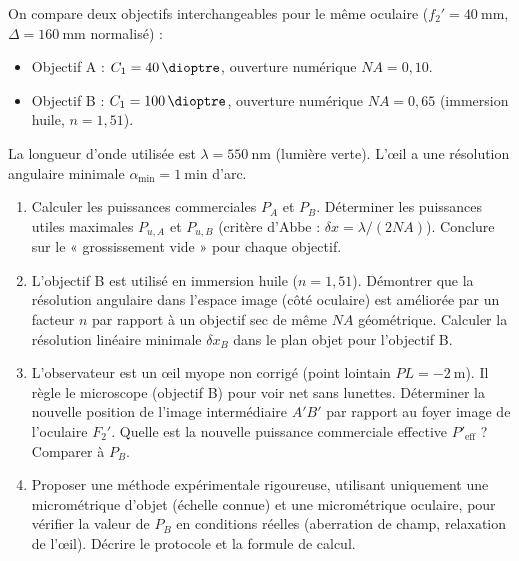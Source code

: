 \documentclass[11pt]{article}
\begin{document}
\begin{exercice}
On compare deux objectifs interchangeables pour le même oculaire ($f_2' = \SI{40}{\milli\metre}$, $\Delta = \SI{160}{\milli\metre}$ normalisé) :
\begin{itemize}
    \item Objectif A : $C_1 = \SI{+40}{\dioptre}$, ouverture numérique $NA = 0,10$.
    \item Objectif B : $C_1 = \SI{+100}{\dioptre}$, ouverture numérique $NA = 0,65$ (immersion huile, $n=1,51$).
\end{itemize}
La longueur d'onde utilisée est $\lambda = \SI{550}{\nano\metre}$ (lumière verte). L'œil a une résolution angulaire minimale $\alpha_{\min} = \SI{1}{\minute}$ d'arc.
\begin{enumerate}
    \item Calculer les puissances commerciales $P_A$ et $P_B$. Déterminer les puissances utiles maximales $P_{u,A}$ et $P_{u,B}$ (critère d'Abbe : $\delta x = \lambda / (2 NA)$). Conclure sur le « grossissement vide » pour chaque objectif.
    \item L'objectif B est utilisé en immersion huile ($n=1,51$). Démontrer que la résolution angulaire dans l'espace image (côté oculaire) est améliorée par un facteur $n$ par rapport à un objectif sec de même $NA$ géométrique. Calculer la résolution linéaire minimale $\delta x_B$ dans le plan objet pour l'objectif B.
    \item L'observateur est un œil myope non corrigé (point lointain $PL = \SI{-2}{\metre}$). Il règle le microscope (objectif B) pour voir net sans lunettes. Déterminer la nouvelle position de l'image intermédiaire $A'B'$ par rapport au foyer image de l'oculaire $F_2'$. Quelle est la nouvelle puissance commerciale effective $P'_{\text{eff}}$ ? Comparer à $P_B$.
    \item Proposer une méthode expérimentale rigoureuse, utilisant uniquement une micrométrique d'objet (échelle connue) et une micrométrique oculaire, pour vérifier la valeur de $P_B$ en conditions réelles (aberration de champ, relaxation de l'œil). Décrire le protocole et la formule de calcul.
\end{enumerate}
\end{exercice}
\end{document}
